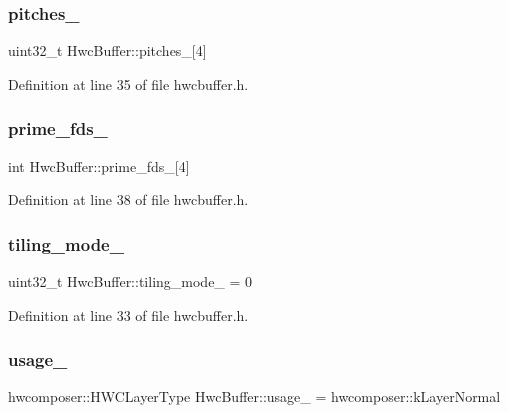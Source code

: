\subsubsection{\texorpdfstring{pitches\+\_\+}{pitches\_}}
{\footnotesize\ttfamily uint32\+\_\+t Hwc\+Buffer\+::pitches\+\_\+\mbox{[}4\mbox{]}}



Definition at line 35 of file hwcbuffer.\+h.

\mbox{\label{structHwcBuffer_a51f659d550dae6ea7b6208019cc08169}} 
\subsubsection{\texorpdfstring{prime\+\_\+fds\+\_\+}{prime\_fds\_}}
{\footnotesize\ttfamily int Hwc\+Buffer\+::prime\+\_\+fds\+\_\+\mbox{[}4\mbox{]}}



Definition at line 38 of file hwcbuffer.\+h.

\mbox{\label{structHwcBuffer_ad054bfc2a178522d502d612ee45f4ac7}} 
\subsubsection{\texorpdfstring{tiling\+\_\+mode\+\_\+}{tiling\_mode\_}}
{\footnotesize\ttfamily uint32\+\_\+t Hwc\+Buffer\+::tiling\+\_\+mode\+\_\+ = 0}



Definition at line 33 of file hwcbuffer.\+h.

\mbox{\label{structHwcBuffer_aa3db6171195a29eb453006b3d5e5c5d9}} 
\subsubsection{\texorpdfstring{usage\+\_\+}{usage\_}}
{\footnotesize\ttfamily hwcomposer\+::\+H\+W\+C\+Layer\+Type Hwc\+Buffer\+::usage\+\_\+ = hwcomposer\+::k\+Layer\+Normal}



